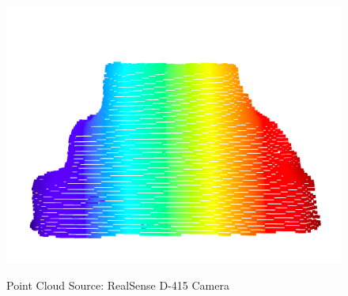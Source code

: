 \begin{figure}[htp]
\begin{center}
{
  \includegraphics[clip,width=0.6\columnwidth]{realnew/realnew_cloud.png}
}
\end{center}
\caption{Point Cloud Source: RealSense D-415 Camera}
\label{newrealsense}
\end{figure}




